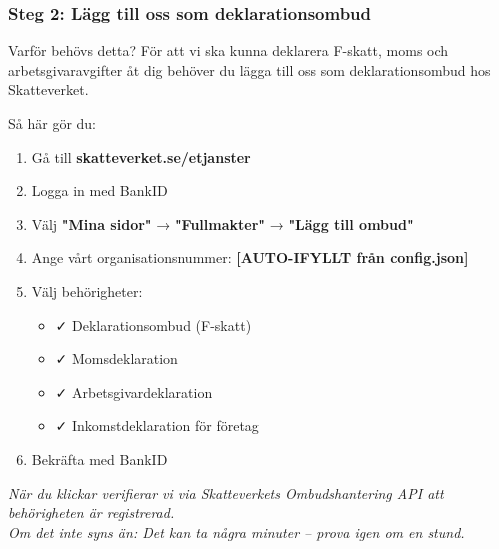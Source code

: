 \documentclass[10pt]{beamer}
\begin{document}
\begin{frame}[fragile]
  \frametitle{Steg 2: Lägg till oss som deklarationsombud}

  \begin{block}{Varför behövs detta?}
    \vspace{0.2cm}
    För att vi ska kunna deklarera F-skatt, moms och arbetsgivaravgifter åt dig behöver du lägga till oss
    som deklarationsombud hos Skatteverket.
  \end{block}

  \vspace{0.4cm}

  \begin{block}{Så här gör du:}
    \footnotesize
    \begin{enumerate}
      \item Gå till \textbf{skatteverket.se/etjanster}
      \item Logga in med BankID
      \item Välj \textbf{"Mina sidor"} → \textbf{"Fullmakter"} → \textbf{"Lägg till ombud"}
      \item Ange vårt organisationsnummer: \textbf{[AUTO-IFYLLT från config.json]}
      \item Välj behörigheter:
        \begin{itemize}
          \item ✓ Deklarationsombud (F-skatt)
          \item ✓ Momsdeklaration
          \item ✓ Arbetsgivardeklaration
          \item ✓ Inkomstdeklaration för företag
        \end{itemize}
      \item Bekräfta med BankID
    \end{enumerate}
  \end{block}

  \vspace{0.4cm}
  \begin{center}
  \end{center}

  \vspace{0.3cm}
  \footnotesize
  \textit{När du klickar verifierar vi via Skatteverkets Ombudshantering API att behörigheten är registrerad.}\\
  \textit{Om det inte syns än: Det kan ta några minuter – prova igen om en stund.}

\end{frame}
\end{document}
